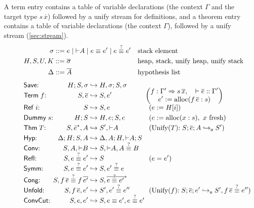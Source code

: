 \documentclass[runningheads]{llncs}
\newcommand{\alloc}{\mathrm{alloc}}
\newcommand{\hto}{\hookrightarrow}
\newcommand{\uto}{\hookrightarrow_{\mathsf{u}}}
\newcommand{\coconv}{\mathrel{\smash{\overset{?}{\equiv}}}}
\begin{document}
A term entry contains a table of variable declarations (the context $\Gamma$ and the target type $s\,\overline{x}$) followed by a unify stream for definitions, and a theorem entry contains a table of variable declarations (the context $\Gamma$), followed by a unify stream (\autoref{sec:stream}).

\begin{figure}
  \begin{align*}
    \sigma ::={}&e\mid {{\vdash} A}\mid e\equiv e'\mid e\coconv e'&&\mbox{stack element}\\
    H,S,U,K::={}&\overline{\sigma}&&\mbox{heap, stack, unify heap, unify stack}\\
    \Delta::={}&\overline{A}&&\mbox{hypothesis list}
  \end{align*}
  \begin{align*}
    &\mathsf{Save}{:}&H;S,\sigma&\hto H,\sigma;S,\sigma\\[-7pt]
    &\mathsf{Term}\;f{:}&S,\overline{e}&\hto S,e'&&\!\!\!\!\left(\begin{gathered}
      f:\Gamma'\Rightarrow s\,\overline{x},\quad \vdash\overline{e}::\Gamma'\\[-3pt]
      e':=\alloc(f\,\overline{e}:s)
    \end{gathered}\right)\\[-4pt]
    &\mathsf{Ref}\;i{:}&S&\hto S,e&&(e:=H[i])\\
    &\rlap{$\mathsf{Dummy}\;s{:}$}&H;S&\hto H,e;S,e&&(e:=\alloc(x:s),\  x\mbox{ fresh})\\
    &\mathsf{Thm}\;T{:}&S,\bar{e}^*,A&\hto S',{{\vdash}A}&&(\mathrm{Unify}(T){:{}}S;\overline{e};A\uto S')\\
    &\mathsf{Hyp}{:}&\Delta;H;S,A&\hto \Delta,A;H,{{\vdash}A};S\\
    &\mathsf{Conv}{:}&S,A,{{\vdash}B}&\hto S,{{\vdash}A},\rlap{$A\coconv B$}\\
    &\mathsf{Refl}{:}&S,e\coconv e'&\hto S&&(e=e')\\
    &\mathsf{Symm}{:}&S,e\coconv e'&\hto S,e'\coconv e\\
    &\mathsf{Cong}{:}&S,f\,\overline{e}\coconv f\,\overline{e'}&\hto S,\overline{e\coconv e'}^*\\
    &\mathsf{Unfold}{:}&S,f\,\overline{e},e'&\hto S',e'\coconv e''&&
      (\mathrm{Unify}(f){:{}}S;\overline{e};e'\uto S',f\,\overline{e}\coconv e'')\\
    &\rlap{$\mathsf{ConvCut}{:}$}&S,e,e'&\hto S,\rlap{$e\equiv e',e\coconv e'$}\\

\end{align*}
\end{figure}
\end{document}
